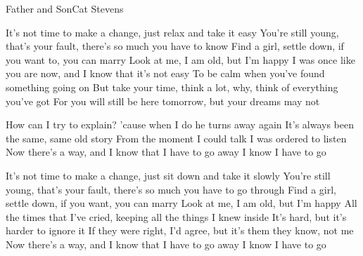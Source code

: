 \begin{song}{Father and Son}{Cat Stevens}{}

It's not time to make a change, just relax and take it easy
You're still young, that's your fault, there's so much you have to know
Find a girl, settle down, if you want to, you can marry
Look at me, I am old, but I'm happy
I was once like you are now, and I know that it's not easy
To be calm when you've found something going on
But take your time, think a lot, why, think of everything you've got
For you will still be here tomorrow, but your dreams may not

How can I try to explain? 'cause when I do he turns away again
It's always been the same, same old story
From the moment I could talk I was ordered to listen
Now there's a way, and I know that I have to go away
I know I have to go

It's not time to make a change, just sit down and take it slowly
You're still young, that's your fault, there's so much you have to go through
Find a girl, settle down, if you want, you can marry
Look at me, I am old, but I'm happy
\newpage
{}
All the times that I've cried, keeping all the things I knew inside
It's hard, but it's harder to ignore it
If they were right, I'd agree, but it's them they know, not me
Now there's a way, and I know that I have to go away
I know I have to go
\end{song}
